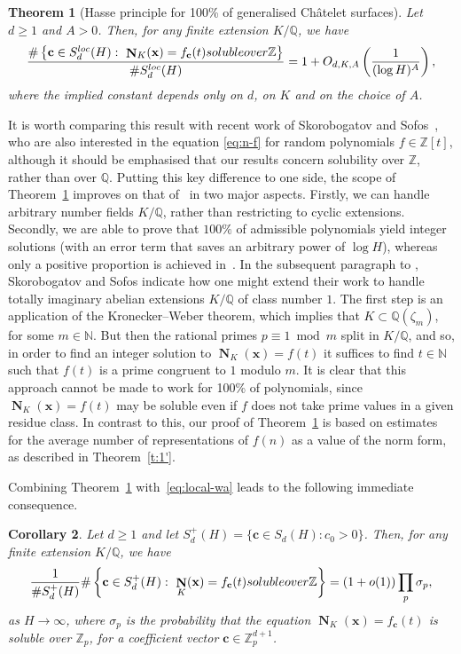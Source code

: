 \documentclass[11pt,letterpaper]{amsart}
\renewcommand{\geq}{\geqslant}
\newtheorem{theorem}{Theorem}[section]
\newtheorem{corollary}[theorem]{Corollary}
\theoremstyle{definition}
\numberwithin{equation}{section}
\newcommand\ZZ{\mathbb{Z}}
\newcommand\NN{\mathbb{N}}
\newcommand\QQ{\mathbb{Q}}
\newcommand{\x}{\mathbf{x}}
\renewcommand{\c}{\mathbf{c}}
\DeclareMathOperator{\nf}{\mathbf{N}}
\newcommand{\0}{\mathbf{0}}
\begin{document}
\begin{theorem}[Hasse principle for 100\% of generalised Ch\^atelet surfaces]\label{t:1}
Let $d\geq 1$ and $A>0$. Then, for any finite extension $K/\mathbb{Q}$, we have 
$$
\frac{\# \left\{ \c\in S_d^{\textnormal{loc}}(H):\,\, \nf_{K}(\mathbf{x})=f_{\mathbf{c}}(t) \textnormal{ soluble over } \ZZ \right\}}{\#S_d^{\textnormal{loc}}(H)}= 1+O_{d,K,A}\left(\frac{1}{(\log H)^A}\right),
$$
where the implied constant depends only on $d$, on  $K$ and on the choice of $A$.
\end{theorem}

It is worth  comparing this result with recent work of Skorobogatov and Sofos~\cite{SS}, 
who are also interested in the equation 
\eqref{eq:n-f} for random polynomials $f\in \ZZ[t]$, although
it should be emphasised that our results concern solubility over $\ZZ$, rather than over $\QQ$. Putting this key difference to one side, the scope of Theorem~\ref{t:1} 
improves on that of~\cite[Thm.~1.3]{SS} in two major aspects. Firstly, we can handle arbitrary number fields $K/\QQ$, rather than restricting to cyclic extensions.  Secondly, we are able to prove that $100\%$ of admissible polynomials 
yield integer solutions (with an error term that saves an arbitrary power of $\log H$), 
whereas only a positive proportion is achieved in~\cite{SS}. 
In the subsequent paragraph to \cite[Thm.~1.3]{SS},   Skorobogatov and Sofos
indicate how one might extend their work to handle totally imaginary abelian extensions $K/\QQ$ of class number $1$.  The first step
is an application of the 
Kronecker--Weber theorem, which implies that $K\subset \mathbb{Q}(\zeta_m)$, 
for some  $m\in \NN$.
But then the rational primes $p\equiv 1\bmod m$ split in $K/\mathbb{Q}$, and so, in order to find an integer solution to $\nf_{K}(\mathbf{x})=f(t)$ it suffices to find $t\in \NN$ such that $f(t)$ is a prime congruent to $1$ modulo $m$. It is clear that this  approach cannot be made to work 
for 100\% of polynomials, since $\nf_{K}(\mathbf{x})=f(t)$ may be soluble even if $f$ does not take prime values in a given residue class. In contrast to this, our proof of Theorem~\ref{t:1} is  based on estimates for the average number of representations of $f(n)$ as a value of the norm form, as described in  Theorem~\ref{t:1'}. 



Combining Theorem~\ref{t:1}  with~\eqref{eq:local-wa} leads to the  following immediate consequence. 

\begin{corollary}
Let $d\geq 1$ and let $S_d^+(H)=\{\c\in S_d(H): c_0>0\}$. 
Then, for any  finite extension $K/\QQ$, we have
$$
\frac{1}{\#S_d^+(H) }\# \left\{ \c\in S_d^{+}(H):\,\, \nf_{K}(\mathbf{x})=f_{\mathbf{c}}(t) \textnormal{ soluble over } \ZZ\right\}
=(1+o(1)) \prod_p \sigma_p,
$$
as $H\to \infty$,
where $\sigma_p$ is the probability that 
the equation $\nf_K(\x)=f_\c(t)$ is soluble over $\ZZ_p$, for a 
coefficient vector  $\c\in \ZZ_p^{d+1}$.
\end{corollary}
\end{document}
